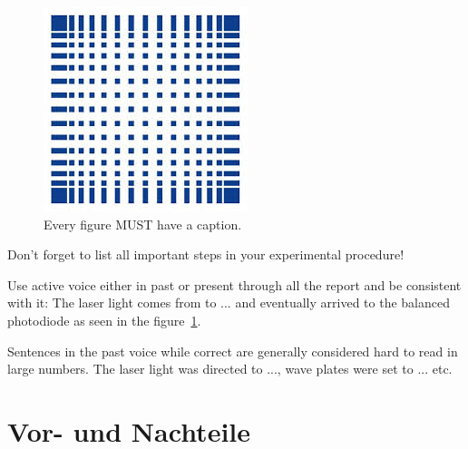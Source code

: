 \documentclass[letterpaper,12pt]{article}
\begin{document}
	\begin{figure}[ht] 
		\centering \includegraphics[width=0.8\columnwidth]{Images/hsMannheim.jpg}
		\caption{
			\label{fig:samplesetup} %
			Every figure MUST have a caption.
		}
	\end{figure}
	
	Don't forget to list all important steps in your experimental procedure!
	
	Use active voice either in past or present through all the report and be
	consistent with it:
	The laser light comes  from to ... and eventually arrived to the
	balanced photodiode as seen in the figure~\ref{fig:samplesetup}.
	
	Sentences in the past voice while correct are generally considered hard to read
	in large numbers. The laser light was directed to ..., wave plates were set
	to ... etc.
	
	
	\section{Vor- und Nachteile}
	
\end{document}
